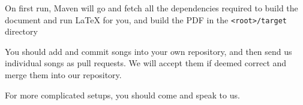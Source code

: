 \documentclass[16pt,a4paper,oneside]{book}
\newcommand{\latex}{\LaTeX\xspace}
\begin{document}
On first run, Maven will go and fetch all the dependencies required to build the document and run \latex for you, and build the PDF in the \texttt{<root>/target} directory


You should add and commit songs into your own repository, and then send us individual songs as pull requests. We will accept them if deemed correct and merge them into our repository.

For more complicated setups, you should come and speak to us.



\end{document}
